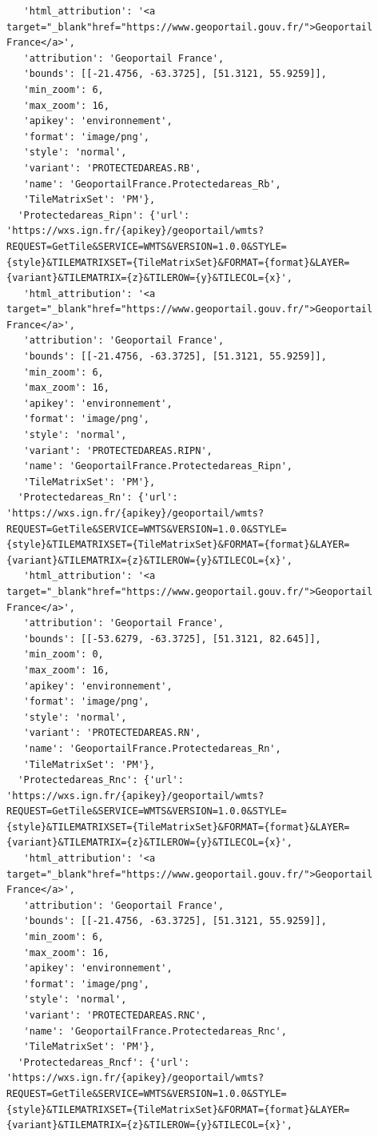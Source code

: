 \documentclass[
  letterpaper,
  DIV=11,
  numbers=noendperiod]{scrreprt}
\begin{document}
\begin{verbatim}
   'html_attribution': '<a target="_blank"href="https://www.geoportail.gouv.fr/">Geoportail France</a>',
   'attribution': 'Geoportail France',
   'bounds': [[-21.4756, -63.3725], [51.3121, 55.9259]],
   'min_zoom': 6,
   'max_zoom': 16,
   'apikey': 'environnement',
   'format': 'image/png',
   'style': 'normal',
   'variant': 'PROTECTEDAREAS.RB',
   'name': 'GeoportailFrance.Protectedareas_Rb',
   'TileMatrixSet': 'PM'},
  'Protectedareas_Ripn': {'url': 'https://wxs.ign.fr/{apikey}/geoportail/wmts?REQUEST=GetTile&SERVICE=WMTS&VERSION=1.0.0&STYLE={style}&TILEMATRIXSET={TileMatrixSet}&FORMAT={format}&LAYER={variant}&TILEMATRIX={z}&TILEROW={y}&TILECOL={x}',
   'html_attribution': '<a target="_blank"href="https://www.geoportail.gouv.fr/">Geoportail France</a>',
   'attribution': 'Geoportail France',
   'bounds': [[-21.4756, -63.3725], [51.3121, 55.9259]],
   'min_zoom': 6,
   'max_zoom': 16,
   'apikey': 'environnement',
   'format': 'image/png',
   'style': 'normal',
   'variant': 'PROTECTEDAREAS.RIPN',
   'name': 'GeoportailFrance.Protectedareas_Ripn',
   'TileMatrixSet': 'PM'},
  'Protectedareas_Rn': {'url': 'https://wxs.ign.fr/{apikey}/geoportail/wmts?REQUEST=GetTile&SERVICE=WMTS&VERSION=1.0.0&STYLE={style}&TILEMATRIXSET={TileMatrixSet}&FORMAT={format}&LAYER={variant}&TILEMATRIX={z}&TILEROW={y}&TILECOL={x}',
   'html_attribution': '<a target="_blank"href="https://www.geoportail.gouv.fr/">Geoportail France</a>',
   'attribution': 'Geoportail France',
   'bounds': [[-53.6279, -63.3725], [51.3121, 82.645]],
   'min_zoom': 0,
   'max_zoom': 16,
   'apikey': 'environnement',
   'format': 'image/png',
   'style': 'normal',
   'variant': 'PROTECTEDAREAS.RN',
   'name': 'GeoportailFrance.Protectedareas_Rn',
   'TileMatrixSet': 'PM'},
  'Protectedareas_Rnc': {'url': 'https://wxs.ign.fr/{apikey}/geoportail/wmts?REQUEST=GetTile&SERVICE=WMTS&VERSION=1.0.0&STYLE={style}&TILEMATRIXSET={TileMatrixSet}&FORMAT={format}&LAYER={variant}&TILEMATRIX={z}&TILEROW={y}&TILECOL={x}',
   'html_attribution': '<a target="_blank"href="https://www.geoportail.gouv.fr/">Geoportail France</a>',
   'attribution': 'Geoportail France',
   'bounds': [[-21.4756, -63.3725], [51.3121, 55.9259]],
   'min_zoom': 6,
   'max_zoom': 16,
   'apikey': 'environnement',
   'format': 'image/png',
   'style': 'normal',
   'variant': 'PROTECTEDAREAS.RNC',
   'name': 'GeoportailFrance.Protectedareas_Rnc',
   'TileMatrixSet': 'PM'},
  'Protectedareas_Rncf': {'url': 'https://wxs.ign.fr/{apikey}/geoportail/wmts?REQUEST=GetTile&SERVICE=WMTS&VERSION=1.0.0&STYLE={style}&TILEMATRIXSET={TileMatrixSet}&FORMAT={format}&LAYER={variant}&TILEMATRIX={z}&TILEROW={y}&TILECOL={x}',

\end{verbatim}
\end{document}
